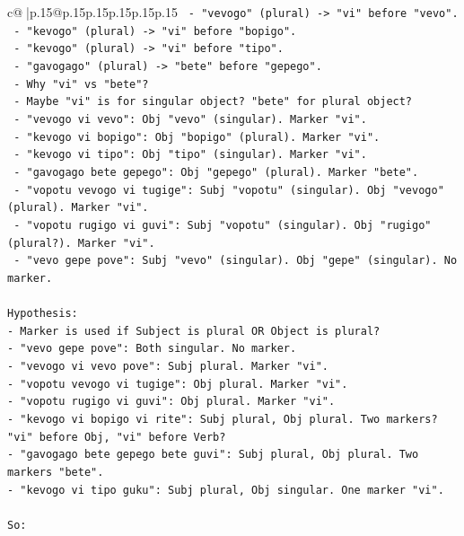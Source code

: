 \documentclass{article}
\begin{document}
{\begin{supertabular}{c@{$\;$}|p{.15\linewidth}@{}p{.15\linewidth}p{.15\linewidth}p{.15\linewidth}p{.15\linewidth}p{.15\linewidth}}
{{{\texttt{  {-} "vevogo" (plural) {-}> "vi" before "vevo".} \\
\texttt{  {-} "kevogo" (plural) {-}> "vi" before "bopigo".} \\
\texttt{  {-} "kevogo" (plural) {-}> "vi" before "tipo".} \\
\texttt{  {-} "gavogago" (plural) {-}> "bete" before "gepego".} \\
\texttt{  {-} Why "vi" vs "bete"?} \\
\texttt{  {-} Maybe "vi" is for singular object? "bete" for plural object?} \\
\texttt{  {-} "vevogo vi vevo": Obj "vevo" (singular). Marker "vi".} \\
\texttt{  {-} "kevogo vi bopigo": Obj "bopigo" (plural). Marker "vi".} \\
\texttt{  {-} "kevogo vi tipo": Obj "tipo" (singular). Marker "vi".} \\
\texttt{  {-} "gavogago bete gepego": Obj "gepego" (plural). Marker "bete".} \\
\texttt{  {-} "vopotu vevogo vi tugige": Subj "vopotu" (singular). Obj "vevogo" (plural). Marker "vi".} \\
\texttt{  {-} "vopotu rugigo vi guvi": Subj "vopotu" (singular). Obj "rugigo" (plural?). Marker "vi".} \\
\texttt{  {-} "vevo gepe pove": Subj "vevo" (singular). Obj "gepe" (singular). No marker.} \\
\\ 
\texttt{Hypothesis:} \\
\texttt{{-} Marker is used if Subject is plural OR Object is plural?} \\
\texttt{{-} "vevo gepe pove": Both singular. No marker.} \\
\texttt{{-} "vevogo vi vevo pove": Subj plural. Marker "vi".} \\
\texttt{{-} "vopotu vevogo vi tugige": Obj plural. Marker "vi".} \\
\texttt{{-} "vopotu rugigo vi guvi": Obj plural. Marker "vi".} \\
\texttt{{-} "kevogo vi bopigo vi rite": Subj plural, Obj plural. Two markers? "vi" before Obj, "vi" before Verb?} \\
\texttt{{-} "gavogago bete gepego bete guvi": Subj plural, Obj plural. Two markers "bete".} \\
\texttt{{-} "kevogo vi tipo guku": Subj plural, Obj singular. One marker "vi".} \\
\\ 
\texttt{So:} \\
}}}
\end{supertabular}}
\end{document}
